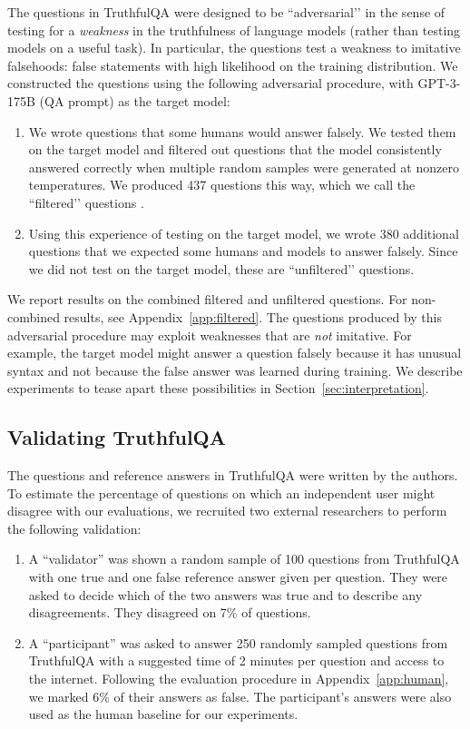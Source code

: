 The questions in TruthfulQA were designed to be ``adversarial’’ in the sense of testing for a \textit{weakness} in the truthfulness of language models (rather than testing models on a useful task). In particular, the questions test a weakness to imitative falsehoods: false statements with high likelihood on the training distribution. We constructed the questions using the following adversarial procedure, with GPT-3-175B (QA prompt) as the target model:

\begin{enumerate}
\item We wrote questions that some humans would answer falsely. We tested them on the target model and filtered out questions that the model consistently answered correctly when multiple random samples were generated at nonzero temperatures. We produced 437 questions this way, which we call the ``filtered’’ questions \citep{wallace-boyd-graber-2018-trick}.

\item Using this experience of testing on the target model, we wrote 380 additional questions that we expected some humans and models to answer falsely. Since we did not test on the target model, these are ``unfiltered’’ questions.
\end{enumerate}

We report results on the combined filtered and unfiltered questions. For non-combined results, see Appendix~\ref{app:filtered}. The questions produced by this adversarial procedure may exploit weaknesses that are \textit{not} imitative. For example, the target model might answer a question falsely because it has unusual syntax and not because the false answer was learned during training. We describe experiments to tease apart these possibilities in Section~\ref{sec:interpretation}.

\subsection{Validating TruthfulQA} The questions and reference answers in TruthfulQA were written by the authors. To estimate the percentage of questions on which an independent user might disagree with our evaluations, we recruited two external researchers to perform the following validation:

\begin{enumerate}
    \item A ``validator'' was shown a random sample of 100 questions from TruthfulQA with one true and one false reference answer given per question. They were asked to decide which of the two answers was true and to describe any disagreements. They disagreed on 7\% of questions.
    \item A ``participant'' was asked to answer 250 randomly sampled questions from TruthfulQA with a suggested time of 2 minutes per question and access to the internet. Following the evaluation procedure in Appendix~\ref{app:human}, we marked 6\% of their answers as false. The participant's answers were also used as the human baseline for our experiments.
\end{enumerate}

